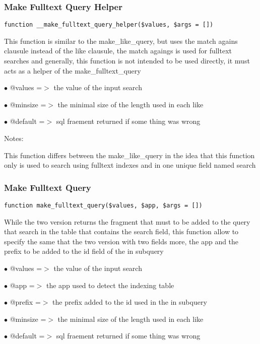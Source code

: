 \documentclass[a4paper]{article}
\begin{document}
\hypertarget{toc230}{}
\subsubsection{Make Fulltext Query Helper}

\begin{lstlisting}
function __make_fulltext_query_helper($values, $args = [])
\end{lstlisting}

This function is similar to the make\_like\_query, but uses the match agains
clausule instead of the like clausule, the match agaings is used for
fulltext searches and generally, this function is not intended to be used
directly, it must acts as a helper of the make\_fulltext\_query

\begin{compactitem}
\item[\color{myblue}$\bullet$] @values  =$>$ the value of the input search
\item[\color{myblue}$\bullet$] @minsize =$>$ the minimal size of the length used in each like
\item[\color{myblue}$\bullet$] @default =$>$ sql fraement returned if some thing was wrong
\end{compactitem}

Notes:

This function differs between the make\_like\_query in the idea that this
function only is used to search using fulltext indexes and in one unique
field named search

\hypertarget{toc231}{}
\subsubsection{Make Fulltext Query}

\begin{lstlisting}
function make_fulltext_query($values, $app, $args = [])
\end{lstlisting}

While the two version returns the fragment that must to be added to the
query that search in the table that contains the search field, this function
allow to specify the same that the two version with two fields more, the
app and the prefix to be added to the id field of the in subquery

\begin{compactitem}
\item[\color{myblue}$\bullet$] @values  =$>$ the value of the input search
\item[\color{myblue}$\bullet$] @app     =$>$ the app used to detect the indexing table
\item[\color{myblue}$\bullet$] @prefix  =$>$ the prefix added to the id used in the in subquery
\item[\color{myblue}$\bullet$] @minsize =$>$ the minimal size of the length used in each like
\item[\color{myblue}$\bullet$] @default =$>$ sql fraement returned if some thing was wrong
\end{compactitem}
\end{document}
